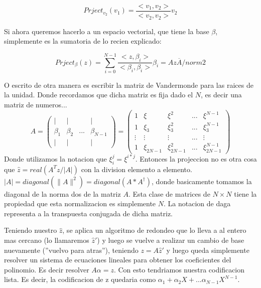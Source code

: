 \documentclass[12pt, oneside]{article}
\begin{document}
\begin{equation*}
    Prject_{v_2}(v_1) = \frac{<v_1,v_2>}{<v_2,v_2>}v_2
    \label{eq:project}
\end{equation*}

Si ahora queremos hacerlo a un espacio vectorial, que tiene la base $\beta$, simplemente
es la sumatoria de lo recien explicado:

\begin{equation*}
    Prject_{\beta}(z) = \sum_{i=0}^{N-1}\frac{<z,\beta_i>}{<\beta_i,\beta_i>}\beta_i = Az\overline{A}/norm2
    \label{eq:project}
\end{equation*}



O escrito de otra manera es escribir la matriz de Vandermonde para las raices de la unidad.
Donde recordamos que dicha matriz es fija dado el $N$, es decir una matriz de numeros...
\begin{equation*}
    A=    \begin{pmatrix}
        | & | &    & | \\
        \beta_1 & \beta_2 & ... & \beta_{N-1}\\
        | & | &    & |
    \end{pmatrix}
    =
    \begin{pmatrix}
        1 & \xi &  \xi^2 & ... & \xi^{N-1} \\
        1 & \xi_3 & \xi_3^2 & ... & \xi_3^{N-1}\\
        \vdots & \vdots & \vdots & ... & \vdots\\
        1 & \xi_{2N-1} & \xi_{2N-1}^2 & ... & \xi_{2N-1}^{N-1}
    \end{pmatrix}
    \label{eq:vandermonde}
\end{equation*}
Donde utilizamos la notacion que $\xi_i^j=\xi^{i*j}$.
Entonces la projeccion no es otra cosa que $\hat{z} = real(A^Tz/|A|)$ con la division
elemento a elemento.
$|A|=diagonal(\parallel A\parallel^2)= diagonal(A*A^\dagger)$, donde basicamente tomamos la diagonal de
la norma dos de la matriz $A$.
Esta clase de matrices de $N\times N$ tiene la propiedad que esta normalizacion es simplemente $N$.
La notacion de daga representa a la transpuesta conjugada de dicha matriz.


Teniendo nuestro $\hat{z}$, se aplica un algoritmo de redondeo que lo lleva a al entero mas cercano
(lo llamaremos $\hat{z}'$) y luego se vuelve a realizar un cambio de base nuevamente (''vuelvo
para atras''),
teniendo $z = A\hat{z}'$ y luego queda simplemente resolver un sistema de ecuaciones lineales para
obtener los coeficientes del polinomio.
Es decir resolver $A\alpha=z$.
Con esto tendriamos nuestra codificacion lista.
Es decir, la codificacion de z quedaria como $\alpha_1 + \alpha_2 X + ... \alpha_{N-1}X^{N-1}$.
\end{document}
